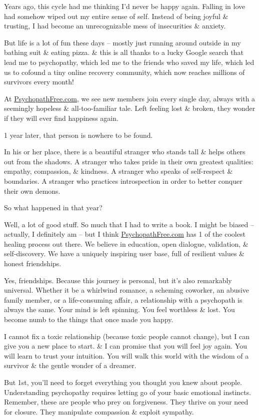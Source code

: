 \documentclass{article}
\numberwithin{equation}{section}
\begin{document}
Years ago, this cycle had me thinking I'd never be happy again. Falling in love had somehow wiped out my entire sense of self. Instead of being joyful \& trusting, I had become an unrecognizable mess of insecurities \& anxiety.

But life is a lot of fun these days -- mostly just running around outside in my bathing suit \& eating pizza. \& this is all thanks to a lucky Google search that lead me to psychopathy, which led me to the friends who saved my life, which led us to cofound a tiny online recovery community, which now reaches millions of survivors every month!

At \url{PsychopathFree.com}, we see new members join every single day, always with a seemingly hopeless \& all-too-familiar tale. Left feeling lost \& broken, they wonder if they will ever find happiness again.

1 year later, that person is nowhere to be found.

In his or her place, there is a beautiful stranger who stands tall \& helps others out from the shadows. A stranger who takes pride in their own greatest qualities: empathy, compassion, \& kindness. A stranger who speaks of self-respect \& boundaries. A stranger who practices introspection in order to better conquer their own demons.

So what happened in that year?

Well, a lot of good stuff. So much that I had to write a book. I might be biased -- actually, I definitely am -- but I think \url{PsychopathFree.com} has 1 of the coolest healing process out there. We believe in education, open dialogue, validation, \& self-discovery. We have a uniquely inspiring user base, full of resilient values \& honest friendships.

Yes, friendships. Because this journey is personal, but it's also remarkably universal. Whether it be a whirlwind romance, a scheming coworker, an abusive family member, or a life-consuming affair, a relationship with a psychopath is always the same. Your mind is left spinning. You feel worthless \& lost. You become numb to the things that once made you happy.

I cannot fix a toxic relationship (because toxic people cannot change), but I can give you a new place to start. \& I can promise that you will feel joy again. You will learn to trust your intuition. You will walk this world with the wisdom of a survivor \& the gentle wonder of a dreamer.

But 1st, you'll need to forget everything you thought you knew about people. Understanding psychopathy requires letting go of your basic emotional instincts. Remember, these are people who prey on forgiveness. They thrive on your need for closure. They manipulate compassion \& exploit sympathy.
\end{document}
